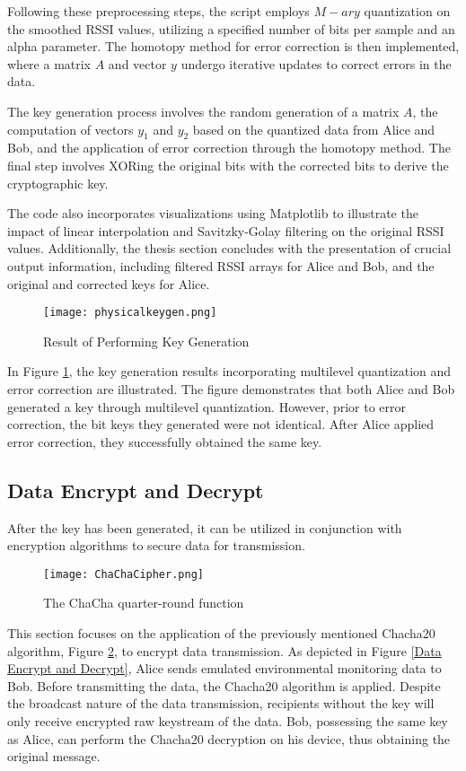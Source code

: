 Following these preprocessing steps, the script employs $M-ary$ quantization on the smoothed RSSI values, utilizing a specified number of bits per sample and an alpha parameter. The homotopy method for error correction is then implemented, where a matrix \(A\) and vector \(y\) undergo iterative updates to correct errors in the data.

The key generation process involves the random generation of a matrix \(A\), the computation of vectors \(y_1\) and \(y_2\) based on the quantized data from Alice and Bob, and the application of error correction through the homotopy method. The final step involves XORing the original bits with the corrected bits to derive the cryptographic key.

The code also incorporates visualizations using Matplotlib to illustrate the impact of linear interpolation and Savitzky-Golay filtering on the original RSSI values. Additionally, the thesis section concludes with the presentation of crucial output information, including filtered RSSI arrays for Alice and Bob, and the original and corrected keys for Alice.
\begin{figure}
  \centering
  \texttt{[image: physicalkeygen.png]}
  \caption{Result of Performing Key Generation}
  \label{physicalkeygen}
\end{figure}

In Figure \ref{physicalkeygen}, the key generation results incorporating multilevel quantization and error correction are illustrated. The figure demonstrates that both Alice and Bob generated a key through multilevel quantization. However, prior to error correction, the bit keys they generated were not identical. After Alice applied error correction, they successfully obtained the same key.

\subsection{Data Encrypt and Decrypt}
After the key has been generated, it can be utilized in conjunction with encryption algorithms to secure data for transmission. 
\begin{figure}
  \centering
  \texttt{[image: ChaChaCipher.png]}
  \caption{The ChaCha quarter-round function}
  \label{ChaChaCipher}
\end{figure}
This section focuses on the application of the previously mentioned Chacha20 algorithm, Figure \ref{ChaChaCipher}\cite{wiki:Chacha20}, to encrypt data transmission. As depicted in Figure \ref{Data Encrypt and Decrypt}, Alice sends emulated environmental monitoring data to Bob. Before transmitting the data, the Chacha20 algorithm is applied. Despite the broadcast nature of the data transmission, recipients without the key will only receive encrypted raw keystream of the data. Bob, possessing the same key as Alice, can perform the Chacha20 decryption on his device, thus obtaining the original message.

